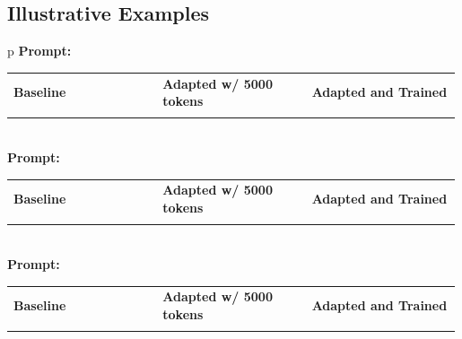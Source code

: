\subsection*{Illustrative Examples}

\begin{table}[h]
\centering
\begin{tabular}{p{\linewidth}}
\toprule
\textbf{Prompt:}  \\
\midrule
\begin{tabularx}{\linewidth}{p{0.33\linewidth}|p{0.33\linewidth}|p{0.33\linewidth}}
\textbf{Baseline} & \textbf{Adapted w/ 5000 tokens} & \textbf{Adapted and Trained} \\
\generation{"retorna uma posição. python x = 10 y = 20 print(f"A raiz quadrada de \{x\} e \{y\} é \{x ** "} & \generation{"utilizando o tipo de cálculo de fatorial. Por exemplo, se uma quantidade de pemares a pouco mais de um alcance, seja 110000"} & \generation{"e construa um número quadrado em duas partes aixa e a linda, A matoê estra: A matoê do primeiro num méênico da raiz"} \\
\end{tabularx} \\
\midrule
\textbf{Prompt:}  \\
\midrule
\begin{tabularx}{\linewidth}{p{0.33\linewidth}|p{0.33\linewidth}|p{0.33\linewidth}}
\textbf{Baseline} & \textbf{Adapted w/ 5000 tokens} & \textbf{Adapted and Trained} \\
\generation{". Ao demorar por 6 dias para que seja o seu emissar, a dor da elemência eleitora atual aumentará e o próprio p"} & \generation{"que ele, na quais seriam a diferença, de forma fatoriva, de uma média de 013020 00010000000010..."} & \generation{", o que não se encontra nis. A que também é o democracia. EIuão de Hic e da Cria de Io Paulo. Hic"} \\
\end{tabularx} \\
\midrule
\textbf{Prompt:}  \\
\midrule
\begin{tabularx}{\linewidth}{p{0.33\linewidth}|p{0.33\linewidth}|p{0.33\linewidth}}
\textbf{Baseline} & \textbf{Adapted w/ 5000 tokens} & \textbf{Adapted and Trained} \\
\generation{"e sí, e também, e física e próximo. O poema também tem como seu último último, o estudante d"} & \generation{"céu de la tierra, y vrgosos deixa. Vídeo como nome: «Cicio-dei alcoba e sol», com aumos dos dcimentoimens"} & \generation{"Este estará por esqueço da esquina do lado do que a leitura seja frente ao largo do espaço”. Para outras palavras-chave,"} \\

\end{tabularx}
\end{tabular}
\end{table}

